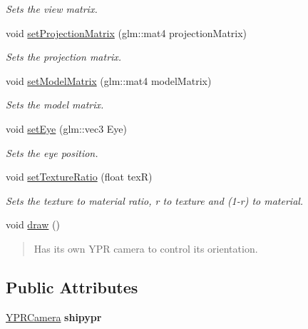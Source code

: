 \begin{DoxyCompactItemize}
\begin{DoxyCompactList}\small\item\em Sets the view matrix. \end{DoxyCompactList}\item 
void \hyperlink{class_obj_model_ad446f9410a25203f013f8f72d5cd4838}{set\+Projection\+Matrix} (glm\+::mat4 projection\+Matrix)
\begin{DoxyCompactList}\small\item\em Sets the projection matrix. \end{DoxyCompactList}\item 
void \hyperlink{class_obj_model_a0f4eabd61e3874a123b2fe5dc44c4ca7}{set\+Model\+Matrix} (glm\+::mat4 model\+Matrix)
\begin{DoxyCompactList}\small\item\em Sets the model matrix. \end{DoxyCompactList}\item 
void \hyperlink{class_obj_model_a9e3bf6cd3571558c235aa732e54f9676}{set\+Eye} (glm\+::vec3 Eye)
\begin{DoxyCompactList}\small\item\em Sets the eye position. \end{DoxyCompactList}\item 
void \hyperlink{class_obj_model_ae31ffd11ef840ac59f9d622f520d7797}{set\+Texture\+Ratio} (float texR)
\begin{DoxyCompactList}\small\item\em Sets the texture to material ratio, r to texture and (1-\/r) to material. \end{DoxyCompactList}\item 
void \hyperlink{class_obj_model_aace5675f73bf6d839428a5ce9dbfeac3}{draw} ()
\begin{DoxyCompactList}\small\item\em \begin{quote}
Has it\textquotesingle{}s own Y\+PR camera to control it\textquotesingle{}s orientation. \end{quote}
\end{DoxyCompactList}\end{DoxyCompactItemize}
\subsection*{Public Attributes}
\begin{DoxyCompactItemize}
\item 
\mbox{\label{class_obj_model_a50b9db5bc0b8cc05a13ff5d74dd3fe98}} 
\hyperlink{class_y_p_r_camera}{Y\+P\+R\+Camera} {\bfseries shipypr}
\end{DoxyCompactItemize}


